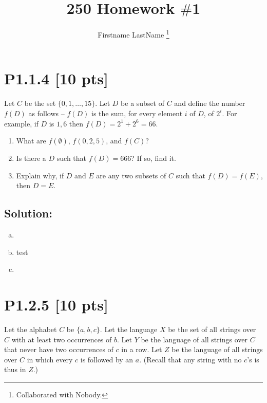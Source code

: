 \documentclass[12pt]{article}
\title{250 Homework $\#$1}
\author{Firstname LastName \footnote{Collaborated with Nobody.}}
\begin{document}
\maketitle

\section*{\textbf{P1.1.4} [10 pts]}
Let $C$ be the set $\{0, 1, \ldots, 15\}$. Let $D$ be a subset of $C$ and define the number $f(D)$ as follows – $f(D)$ is the sum, for every element $i$ of $D$, of $2^i$. For example, if $D$ is ${1, 6}$ then $f(D)= 2^1 + 2^6 = 66$.


\begin{enumerate}[label=(\alph*)]
    \item What are $f(\emptyset)$, $f({0, 2, 5})$, and $f(C)$? 
    
    \item Is there a $D$ such that $f(D) = 666$? If so, find it. 
    
    \item  Explain why, if $D$ and $E$ are any two subsets of $C$ such that $f(D)= f(E)$, then $D = E$.
\end{enumerate}


\subsection*{\textbf{Solution:}}
\begin{enumerate}[(a)]
    \item 

    \item test

    \item 

\end{enumerate}


\newpage
\section*{\textbf{P1.2.5} [10 pts]}
Let the alphabet $C$ be $\{a, b, c\}$. Let the language $X$ be the set of all strings over $C$ with at least two occurrences of $b$. Let $Y$ be the language of all strings over $C$ that never have two occurrences of $c$ in a row. Let $Z$ be the language of all strings over $C$ in which every $c$ is followed by an $a$. (Recall that any string with no $c$’s is thus in $Z$.)
\end{document}
